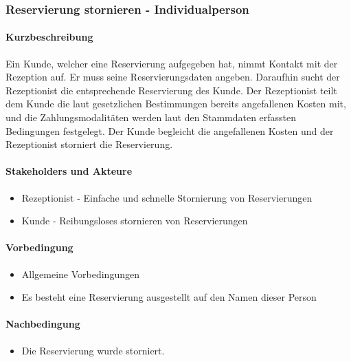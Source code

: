\subsubsection{Reservierung stornieren - Individualperson}

\paragraph{Kurzbeschreibung}
Ein \Gls{Kunde}, welcher eine \Gls{Reservierung} aufgegeben hat, nimmt Kontakt mit der \Gls{Rezeption} auf. Er muss seine Reservierungsdaten angeben. Daraufhin sucht der \Gls{Rezeptionist} die entsprechende \Gls{Reservierung} des \Gls{Kunde}. Der \Gls{Rezeptionist} teilt dem \Gls{Kunde} die laut gesetzlichen Bestimmungen bereits angefallenen Kosten mit, und die Zahlungsmodalitäten werden laut den Stammdaten erfassten Bedingungen festgelegt. Der \Gls{Kunde} begleicht die angefallenen Kosten und der \Gls{Rezeptionist} storniert die \Gls{Reservierung}.

\paragraph{Stakeholders und Akteure}
\begin{itemize}
\item \Gls{Rezeptionist} - Einfache und schnelle Stornierung von Reservierungen
\item \Gls{Kunde} - Reibungsloses stornieren von Reservierungen
\end{itemize}

\paragraph{Vorbedingung}
\begin{itemize}
\item Allgemeine Vorbedingungen
\item Es besteht eine \Gls{Reservierung} ausgestellt auf den Namen dieser Person
\end{itemize}

\paragraph{Nachbedingung}
\begin{itemize}
\item Die \Gls{Reservierung} wurde storniert.
\end{itemize}

